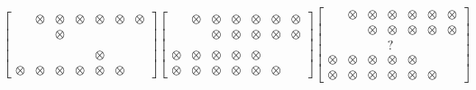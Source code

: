 \begin{equation*}
\begin{bmatrix}
   & \otimes & \otimes & \otimes & \otimes & \otimes & \otimes \\
   &  & \otimes &  &  &  & \\
   &  &  &  &  &  & \\
   &  &  &  & \otimes &  & \\
  \otimes & \otimes & \otimes & \otimes & \otimes & \otimes & 
\end{bmatrix}
\begin{bmatrix}
   & \otimes & \otimes & \otimes & \otimes & \otimes & \otimes \\
   &  & \otimes & \otimes & \otimes & \otimes & \otimes \\
   &  &  &  &  &  & \\
  \otimes & \otimes & \otimes & \otimes & \otimes &  & \\
  \otimes & \otimes & \otimes & \otimes & \otimes & \otimes & 
\end{bmatrix}
\begin{bmatrix}
   & \otimes & \otimes & \otimes & \otimes & \otimes & \otimes \\
   &  & \boxed{\otimes} & \boxed{\otimes} & \otimes & \otimes & \otimes \\
   &  &  & \boxed{?} &  &  & \\
  \otimes & \otimes & \otimes & \otimes & \otimes &  & \\
  \otimes & \otimes & \otimes & \otimes & \otimes & \otimes & 
\end{bmatrix}
\end{equation*}

